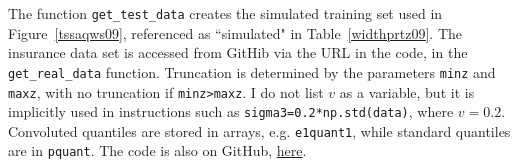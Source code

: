 \documentclass[oneside,10pt]{book}
\begin{document}
The function \texttt{get\_test\_data} creates the simulated training set used in Figure~\ref{tssaqws09},
 referenced as ``simulated" in Table~\ref{widthprtz09}. The insurance data set is accessed
 from GitHib via the URL in the code, in the \texttt{get\_real\_data} function. Truncation
 is determined by the parameters \texttt{minz} and \texttt{maxz}, with no truncation
 if \texttt{minz>maxz}. I do not list $v$ as a variable, but it is
 implicitly used in instructions such as \texttt{sigma3=0.2*np.std(data)}, where $v=0.2$.
 Convoluted quantiles are stored in arrays, e.g. \texttt{e1quant1}, while standard
 quantiles are in \texttt{pquant}.
The code is also on GitHub, 
 \href{https://github.com/VincentGranville/Statistical-Optimization/blob/main/equantile.py}{here}.
\vspace{1ex}

\end{document}
